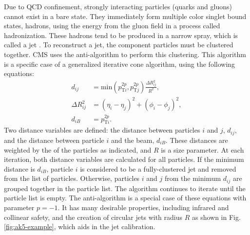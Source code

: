 \documentclass[12pt]{thesis}  %
\begin{document}
Due to QCD confinement, strongly interacting particles (quarks and gluons) cannot exist in a bare state. They immediately form multiple color singlet bound states, hadrons, using the energy from the gluon field in a process called hadronization. These hadrons tend to be produced in a narrow spray, which is called a jet \cite{Salam:2009jx}. To reconstruct a jet, the component particles must be clustered together. CMS uses the anti-\kt algorithm \cite{Cacciari:2008gp} to perform this clustering. This algorithm is a specific case of a generalized iterative cone algorithm, using the following equations:
\begin{align}
d_{ij} &= \text{min}(p_{\text{T}i}^{2p},p_{\text{T}j}^{2p})\frac{\Delta R_{ij}^{2}}{R^{2}}, \\
\Delta R_{ij}^{2} &= (\eta_i - \eta_j)^2 + (\phi_i - \phi_j)^{2}, \\
d_{iB} &= p_{\text{T}i}^{2p}.
\end{align}
Two distance variables are defined: the distance between particles $i$ and $j$, $d_{ij}$, and the distance between particle $i$ and the beam, $d_{iB}$. These distances are weighted by the \pt of the particles as indicated, and $R$ is a size parameter. At each iteration, both distance variables are calculated for all particles. If the minimum distance is $d_{iB}$, particle $i$ is considered to be a fully-clustered jet and removed from the list of particles. Otherwise, particles $i$ and $j$ from the minimum $d_{ij}$ are grouped together in the particle list. The algorithm continues to iterate until the particle list is empty. The anti-\kt algorithm is a special case of these equations with parameter $p=-1$. It has many desirable properties, including infrared and collinear safety, and the creation of circular jets with radius $R$ as shown in Fig. \ref{fig:ak5-example}, which aids in the jet calibration.
\end{document}
